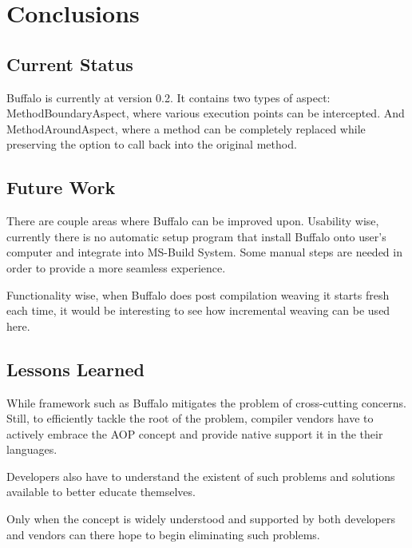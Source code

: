 \chapter{Conclusions}
\section{Current Status}

Buffalo is currently at version 0.2. It contains two types of aspect: MethodBoundaryAspect, where various execution points can be intercepted. And MethodAroundAspect, where a method can be completely replaced while preserving the option to call back into the original method.

\section{Future Work}

There are couple areas where Buffalo can be improved upon. Usability wise, currently there is no automatic setup program that install Buffalo onto user’s computer and integrate into MS-Build System. Some manual steps are needed in order to provide a more seamless experience.

Functionality wise, when Buffalo does post compilation weaving it starts fresh each time, it would be interesting to see how incremental weaving can be used here.

\section{Lessons Learned}

While framework such as Buffalo mitigates the problem of cross-cutting concerns. Still, to efficiently tackle the root of the problem, compiler vendors have to actively embrace the AOP concept and provide native support it in the their languages. 

Developers also have to understand the existent of such problems and solutions available to better educate themselves.

Only when the concept is widely understood and supported by both developers and vendors can there hope to begin eliminating such problems.
